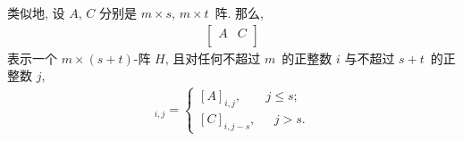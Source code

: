 类似地, 设 \(A\), \(C\)
分别是 \(m \times s\), \(m \times t\)~阵.
那么,
\begin{align*}
    \begin{bmatrix}
        A & C \\
    \end{bmatrix}
\end{align*}
表示一个 \(m \times (s + t)\)-阵 \(H\),
且对任何不超过 \(m\)~的正整数 \(i\)
与不超过 \(s + t\)~的正整数 \(j\),
\begin{align*}
    [H]_{i,j}
    = \begin{cases}
          [A]_{i,j},
           & \text{\(j \leq s\)}; \\
          [C]_{i,j-s},
           & \text{ \(j > s\)}.
      \end{cases}
\end{align*}

